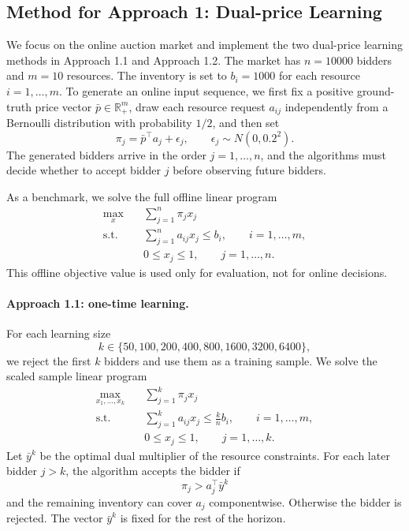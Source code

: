 \subsection{Method for Approach 1: Dual-price Learning}

We focus on the online auction market and implement the two dual-price learning
methods in Approach 1.1 and Approach 1.2.  The market has $n=10000$ bidders and
$m=10$ resources.  The inventory is set to $b_i=1000$ for each resource
$i=1,\ldots,m$.  To generate an online input sequence, we first fix a positive
ground-truth price vector $\bar p\in\mathbb{R}^m_+$, draw each resource request
$a_{ij}$ independently from a Bernoulli distribution with probability $1/2$, and
then set
\[
    \pi_j = \bar p^\top a_j + \epsilon_j,
    \qquad \epsilon_j\sim N(0, 0.2^2).
\]
The generated bidders arrive in the order $j=1,\ldots,n$, and the algorithms
must decide whether to accept bidder $j$ before observing future bidders.

As a benchmark, we solve the full offline linear program
\[
\begin{aligned}
    \max_x \quad & \sum_{j=1}^n \pi_j x_j \\
    \text{s.t.}\quad
        & \sum_{j=1}^n a_{ij}x_j \le b_i,\qquad i=1,\ldots,m,\\
        & 0\le x_j\le 1,\qquad j=1,\ldots,n.
\end{aligned}
\]
This offline objective value is used only for evaluation, not for online
decisions.

\paragraph{Approach 1.1: one-time learning.}
For each learning size
\[
    k\in\{50,100,200,400,800,1600,3200,6400\},
\]
we reject the first $k$ bidders and use them as a training sample.  We solve the
scaled sample linear program
\[
\begin{aligned}
    \max_{x_1,\ldots,x_k}\quad
        & \sum_{j=1}^k \pi_j x_j\\
    \text{s.t.}\quad
        & \sum_{j=1}^k a_{ij}x_j \le \frac{k}{n}b_i,
          \qquad i=1,\ldots,m,\\
        & 0\le x_j\le 1,\qquad j=1,\ldots,k.
\end{aligned}
\]
Let $\bar y^k$ be the optimal dual multiplier of the resource constraints.  For
each later bidder $j>k$, the algorithm accepts the bidder if
\[
    \pi_j > a_j^\top \bar y^k
\]
and the remaining inventory can cover $a_j$ componentwise.  Otherwise the bidder
is rejected.  The vector $\bar y^k$ is fixed for the rest of the horizon.

